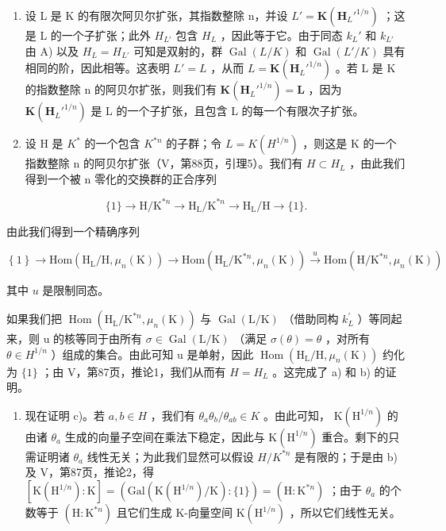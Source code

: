 \begin{enumerate}
\def\labelenumi{\Alph{enumi})}
\setcounter{enumi}{1}
\item
  设 L 是 K 的有限次阿贝尔扩张，其指数整除 n，并设 \(L' = \mathbf{K}(\mathbf{H}_{L}'^{1/n})\) ；这是 L 的一个子扩张；此外 \(H_{L'}\) 包含 \(H_{L}\) ，因此等于它。由于同态 \(k_{L}'\) 和 \(k_{L'}\) 由 A) 以及 \(H_{L} = H_{L'}\) 可知是双射的，群 \(\operatorname{Gal}(L/K)\) 和 \(\operatorname{Gal}(L'/K)\) 具有相同的阶，因此相等。这表明 \(L' = L\) ，从而 \(L = \mathbf{K}(\mathbf{H}_{L}'^{1/n})\) 。若 L 是 K 的指数整除 n 的阿贝尔扩张，则我们有 \(\mathbf{K}(\mathbf{H}_{L}'^{1/n}) = \mathbf{L}\) ，因为 \(\mathbf{K}(\mathbf{H}_{L}'^{1/n})\) 是 L 的一个子扩张，且包含 L 的每一个有限次子扩张。
\item
  设 H 是 \(K^{*}\) 的一个包含 \(K^{*n}\) 的子群；令 \(L = K(H^{1/n})\) ，则这是 K 的一个指数整除 n 的阿贝尔扩张（V，第88页，引理5）。我们有 \(H \subset H_{L}\) ，由此我们得到一个被 n 零化的交换群的正合序列
\end{enumerate}

\[
\{1 \} \rightarrow \mathrm{H} / \mathrm{K} ^ {* n} \rightarrow \mathrm{H} _ {\mathrm{L}} / \mathrm{K} ^ {* n} \rightarrow \mathrm{H} _ {\mathrm{L}} / \mathrm{H} \rightarrow \{1 \}.
\]

由此我们得到一个精确序列

\[
\left\{1 \right\}\rightarrow \mathrm{Hom} \left(\mathrm{H} _ {\mathrm{L}} / \mathrm{H}, \mu_ {n} (\mathrm{K})\right)\rightarrow \mathrm{Hom} \left(\mathrm{H} _ {\mathrm{L}} / \mathrm{K} ^ {* n}, \mu_ {n} (\mathrm{K})\right) \stackrel {u} {\rightarrow} \mathrm{Hom} \left(\mathrm{H} / \mathrm{K} ^ {* n}, \mu_ {n} (\mathrm{K})\right)
\]

其中 \(u\) 是限制同态。

如果我们把 \(\operatorname{Hom}(\mathrm{H}_{\mathrm{L}}/\mathrm{K}^{*n},\mu_{n}(\mathrm{K}))\) 与 \(\operatorname{Gal}(\mathrm{L}/\mathrm{K})\) （借助同构 \(k_{L}^{\prime}\) ）等同起来，则 u 的核等同于由所有 \(\sigma\in\operatorname{Gal}(\mathrm{L}/\mathrm{K})\) （满足 \(\sigma(\theta)=\theta\) ，对所有 \(\theta\in H^{1/n}\) ）组成的集合。由此可知 u 是单射，因此 \(\operatorname{Hom}(\mathrm{H}_{\mathrm{L}}/\mathrm{H},\mu_{n}(\mathrm{K}))\) 约化为 \(\{1\}\) ；由 V，第87页，推论1，我们从而有 \(H=H_{L}\) 。这完成了 a) 和 b) 的证明。

\begin{enumerate}
\def\labelenumi{\Alph{enumi})}
\setcounter{enumi}{3}
\tightlist
\item
  现在证明 c)。若 \(a, b \in H\) ，我们有 \(\theta_{a}\theta_{b}/\theta_{ab} \in K\) 。由此可知， \(\mathrm{K}(\mathrm{H}^{1/n})\) 的由诸 \(\theta_{a}\) 生成的向量子空间在乘法下稳定，因此与 \(\mathrm{K}(\mathrm{H}^{1/n})\) 重合。剩下的只需证明诸 \(\theta_{a}\) 线性无关；为此我们显然可以假设 \(H/K^{*n}\) 是有限的；于是由 b) 及 V，第87页，推论2，得 \([\mathrm{K}(\mathrm{H}^{1/n}): \mathrm{K}] = (\mathrm{Gal}(\mathrm{K}(\mathrm{H}^{1/n})/\mathrm{K}) : \{1\}) = (\mathrm{H}: \mathrm{K}^{*n})\) ；由于 \(\theta_{a}\) 的个数等于 \((\mathrm{H}: \mathrm{K}^{*n})\) 且它们生成 K-向量空间 \(\mathrm{K}(\mathrm{H}^{1/n})\) ，所以它们线性无关。
\end{enumerate}

